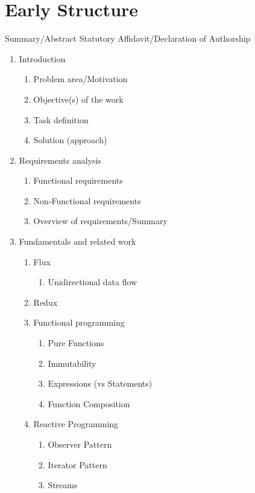 \section{Early Structure}
\label{sec:early-structure}

\quad Summary/Abstract
\quad Statutory Affidavit/Declaration of Authorship
\begin{enumerate}
    \item Introduction
    \begin{enumerate}
        \item Problem area/Motivation
        \item Objective(s) of the work
        \item Task definition
        \item Solution (approach)
    \end{enumerate}
    \item Requirements analysis
    \begin{enumerate}
        \item Functional requirements
        \item Non-Functional requirements
        \item Overview of requirements/Summary
    \end{enumerate}
    \item Fundamentals and related work
    \begin{enumerate}
        \item Flux
        \begin{enumerate}
            \item Unidirectional data flow
        \end{enumerate}
        \item Redux
        \item Functional programming
        \begin{enumerate}
            \item Pure Functions
            \item Immutability
            \item Expressions (vs Statements)
            \item Function Composition
        \end{enumerate}
        \item Reactive Programming
        \begin{enumerate}
            \item Observer Pattern
            \item Iterator Pattern
            \item Streams

\end{enumerate}
\end{enumerate}
\end{enumerate}
